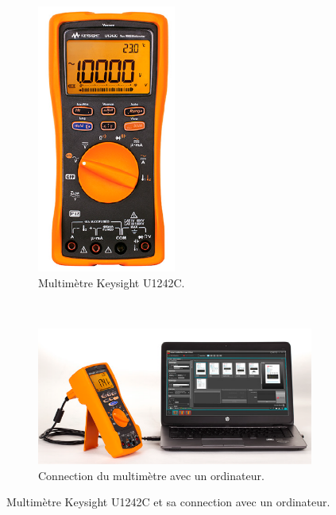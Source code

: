 \begin{figure}[H]
    \centering
    \begin{subfigure}[t]{0.35\textwidth}
        \centering
        \includegraphics[width=0.50\textwidth]{images/U1242C}
        \caption{Multimètre Keysight U1242C.}
    \end{subfigure}%
    ~ 
    \begin{subfigure}[t]{0.55\textwidth}
        \centering
        \includegraphics[width=1.0\textwidth]{images/U1242C-avec-ordinateur}
        \caption{Connection du multimètre avec un ordinateur.}
    \end{subfigure}
    \caption{Multimètre Keysight U1242C et sa connection avec un ordinateur.}
\end{figure}

